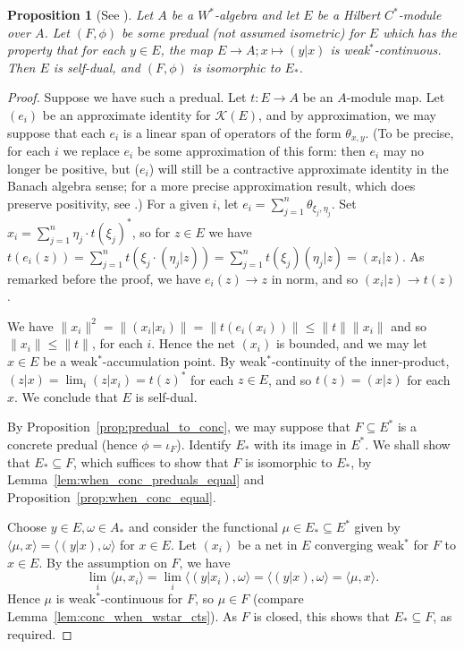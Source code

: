 \documentclass[a4paper,11pt]{article}
\theoremstyle{plain}
\newtheorem{proposition}{Proposition}[section]
\theoremstyle{remark}
\newcommand{\mc}[1]{\mathcal{#1}}
\newcommand{\ip}[2]{{\langle {#1} , {#2} \rangle}}
\begin{document}
\begin{proposition}[{See \cite[Lemma 8.5.4]{BlecherLeMerdy_Book}}]\label{prop:HilbModPredual}
Let $A$ be a $W^*$-algebra and let $E$ be a Hilbert $C^*$-module over $A$.  Let $(F, \phi)$ be some predual (not assumed isometric) for $E$ which has the property that for each $y\in E$, the map $E \to A; x\mapsto (y|x)$ is weak$^*$-continuous.  Then $E$ is self-dual, and $(F, \phi)$ is isomorphic to $E_*$.
\end{proposition}
\begin{proof}
Suppose we have such a predual.  Let $t \colon E \to A$ be an $A$-module map.  Let $(e_i)$ be an approximate identity for $\mc K(E)$, and by approximation, we may suppose that each $e_i$ is a linear span of operators of the form $\theta_{x,y}$.  (To be precise, for each $i$ we replace $e_i$ be some approximation of this form: then $e_i$ may no longer be positive, but ($e_i$) will still be a contractive approximate identity in the Banach algebra sense; for a more precise approximation result, which does preserve positivity, see \cite[8.1.23]{BlecherLeMerdy_Book}.)  For a given $i$, let $e_i = \sum_{j=1}^n \theta_{\xi_j, \eta_j}$.  Set $x_i = \sum_{j=1}^n \eta_j \cdot t(\xi_j)^*$, so for $z\in E$ we have $t(e_i(z)) = \sum_{j=1}^n t(\xi_j \cdot (\eta_j|z)) = \sum_{j=1}^n t(\xi_j) (\eta_j|z) = (x_i|z)$.  As remarked before the proof, we have $e_i(z) \to z$ in norm, and so $(x_i|z) \to t(z)$.

We have $\| x_i \|^2 = \|(x_i|x_i)\| = \|t(e_i(x_i))\| \leq \|t\| \|x_i\|$ and so $\|x_i\| \leq \|t\|$, for each $i$.  Hence the net $(x_i)$ is bounded, and we may let $x\in E$ be a weak$^*$-accumulation point.  By weak$^*$-continuity of the inner-product, $(z|x) = \lim_i (z|x_i) = t(z)^*$ for each $z\in E$, and so $t(z) = (x|z)$ for each $x$.  We conclude that $E$ is self-dual.

By Proposition~\ref{prop:predual_to_conc}, we may suppose that $F \subseteq E^*$ is a concrete predual (hence $\phi = \iota_F$).  Identify $E_*$ with its image in $E^*$.  We shall show that $E_* \subseteq F$, which suffices to show that $F$ is isomorphic to $E_*$, by Lemma~\ref{lem:when_conc_preduals_equal} and Proposition~\ref{prop:when_conc_equal}.

Choose $y\in E, \omega\in A_*$ and consider the functional $\mu \in E_* \subseteq E^*$ given by $\ip{\mu}{x} = \ip{(y|x)}{\omega}$ for $x\in E$.  Let $(x_i)$ be a net in $E$ converging weak$^*$ for $F$ to $x\in E$.  By the assumption on $F$, we have
\[ \lim_i \ip{\mu}{x_i} = \lim_i \ip{(y|x_i)}{\omega} = \ip{(y|x)}{\omega} = \ip{\mu}{x}. \]
Hence $\mu$ is weak$^*$-continuous for $F$, so $\mu\in F$ (compare Lemma~\ref{lem:conc_when_wstar_cts}).  As $F$ is closed, this shows that $E_* \subseteq F$, as required.
\end{proof}
\end{document}
